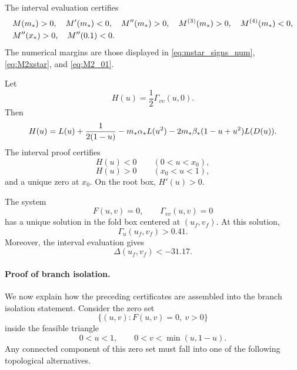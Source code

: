 \begin{proposition}\label{prop:A3}
The interval evaluation certifies
\begin{align}\label{eq:A3_signs}
&M(m_*)>0,
\quad M'(m_*)<0,
\quad M''(m_*)>0,
\quad M^{(3)}(m_*)>0,
\quad M^{(4)}(m_*)<0,
\notag\\
&M''(x_*)>0,
\quad M''(0.1)<0.
\end{align}
The numerical margins are those displayed in \eqref{eq:mstar_signs_num},
\eqref{eq:M2xstar}, and \eqref{eq:M2_01}.
\end{proposition}

\begin{proposition}\label{prop:A4}
Let
\begin{equation}\label{eq:Hdef_appendix}
  H(u)=\frac12\Gamma_{vv}(u,0).
\end{equation}
Then
\begin{equation}\label{eq:Hexplicit_appendix}
  H(u)
  =
  L(u)+\frac{1}{2(1-u)}
  -m_*\alpha_* L(u^2)
  -2m_*\beta_*(1-u+u^2)L(D(u)).
\end{equation}
The interval proof certifies
\[
  H(u)<0\qquad(0<u<x_0),
\]
\[
  H(u)>0\qquad(x_0<u<1),
\]
and a unique zero at \(x_0\).  On the root box, \(H'(u)>0\).
\end{proposition}

\begin{proposition}\label{prop:A5}
The system
\begin{equation}\label{eq:fold_system_app}
  F(u,v)=0,
  \qquad
  \Gamma_{vv}(u,v)=0
\end{equation}
has a unique solution in the fold box centered at \((u_f,v_f)\).  At this
solution,
\begin{equation}\label{eq:fold_Gammau_app}
  \Gamma_u(u_f,v_f)>0.41.
\end{equation}
Moreover, the interval evaluation gives
\begin{equation}\label{eq:fold_delta_app}
  \Delta(u_f,v_f)<-31.17.
\end{equation}
\end{proposition}

\paragraph{Proof of branch isolation.}
We now explain how the preceding certificates are assembled into the branch
isolation statement.  Consider the zero set
\[
  \{(u,v):F(u,v)=0,\ v>0\}
\]
inside the feasible triangle
\[
  0<u<1,
  \qquad
  0<v<\min(u,1-u).
\]
Any connected component of this zero set must fall into one of the following
topological alternatives.

